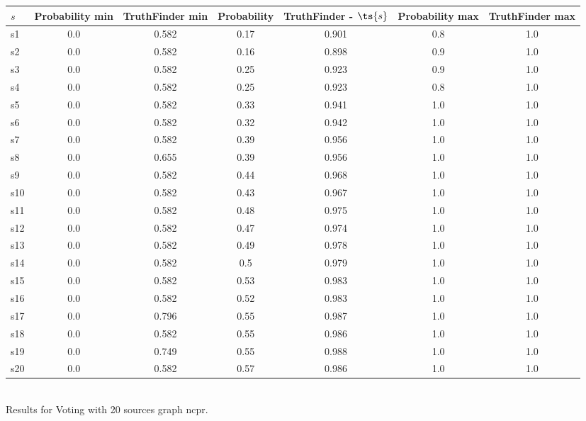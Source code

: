 \documentclass{article}
\begin{document}
\noindent\begin{tabular}{|l|c|c|c|c|c|c|}
\hline
$s$& Probability min & TruthFinder min & Probability & TruthFinder - $\ts{s}$ & Probability max & TruthFinder max\\
\hline
s1 &0.0 & 0.582 & 0.17 & 0.901 & 0.8 & 1.0\\
\hline
s2 &0.0 & 0.582 & 0.16 & 0.898 & 0.9 & 1.0\\
\hline
s3 &0.0 & 0.582 & 0.25 & 0.923 & 0.9 & 1.0\\
\hline
s4 &0.0 & 0.582 & 0.25 & 0.923 & 0.8 & 1.0\\
\hline
s5 &0.0 & 0.582 & 0.33 & 0.941 & 1.0 & 1.0\\
\hline
s6 &0.0 & 0.582 & 0.32 & 0.942 & 1.0 & 1.0\\
\hline
s7 &0.0 & 0.582 & 0.39 & 0.956 & 1.0 & 1.0\\
\hline
s8 &0.0 & 0.655 & 0.39 & 0.956 & 1.0 & 1.0\\
\hline
s9 &0.0 & 0.582 & 0.44 & 0.968 & 1.0 & 1.0\\
\hline
s10 &0.0 & 0.582 & 0.43 & 0.967 & 1.0 & 1.0\\
\hline
s11 &0.0 & 0.582 & 0.48 & 0.975 & 1.0 & 1.0\\
\hline
s12 &0.0 & 0.582 & 0.47 & 0.974 & 1.0 & 1.0\\
\hline
s13 &0.0 & 0.582 & 0.49 & 0.978 & 1.0 & 1.0\\
\hline
s14 &0.0 & 0.582 & 0.5 & 0.979 & 1.0 & 1.0\\
\hline
s15 &0.0 & 0.582 & 0.53 & 0.983 & 1.0 & 1.0\\
\hline
s16 &0.0 & 0.582 & 0.52 & 0.983 & 1.0 & 1.0\\
\hline
s17 &0.0 & 0.796 & 0.55 & 0.987 & 1.0 & 1.0\\
\hline
s18 &0.0 & 0.582 & 0.55 & 0.986 & 1.0 & 1.0\\
\hline
s19 &0.0 & 0.749 & 0.55 & 0.988 & 1.0 & 1.0\\
\hline
s20 &0.0 & 0.582 & 0.57 & 0.986 & 1.0 & 1.0\\
\hline
\end{tabular}\\

\noindent Results for Voting with 20 sources graph ncpr.
\end{document}
